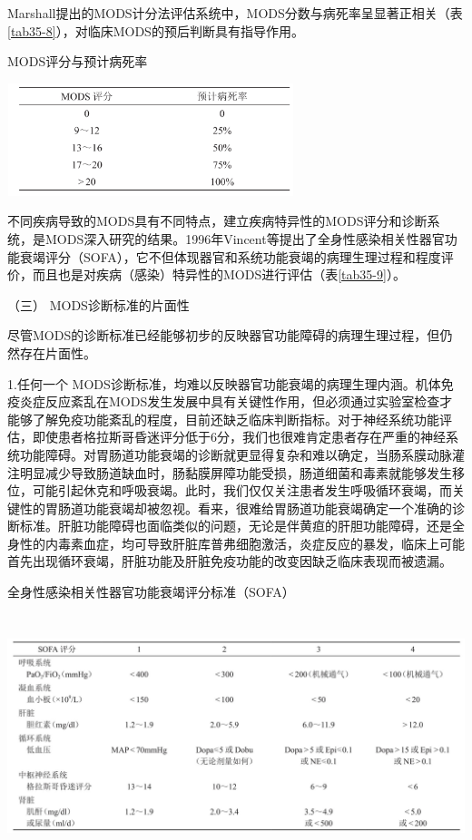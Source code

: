 Marshall提出的MODS计分法评估系统中，MODS分数与病死率呈显著正相关（表\ref{tab35-8}），对临床MODS的预后判断具有指导作用。

\begin{table}[htbp]
\centering
\caption{MODS评分与预计病死率}
\label{tab35-8}
\includegraphics[width=3.29167in,height=1.29167in]{./images/Image00140.jpg}
\end{table}

不同疾病导致的MODS具有不同特点，建立疾病特异性的MODS评分和诊断系统，是MODS深入研究的结果。1996年Vincent等提出了全身性感染相关性器官功能衰竭评分（SOFA），它不但体现器官和系统功能衰竭的病理生理过程和程度评价，而且也是对疾病（感染）特异性的MODS进行评估（表\ref{tab35-9}）。

\hypertarget{text00094.htmlux5cux23CHP3-11-3-3-3}{}
（三） MODS诊断标准的片面性

尽管MODS的诊断标准已经能够初步的反映器官功能障碍的病理生理过程，但仍然存在片面性。

1.任何一个
MODS诊断标准，均难以反映器官功能衰竭的病理生理内涵。机体免疫炎症反应紊乱在MODS发生发展中具有关键性作用，但必须通过实验室检查才能够了解免疫功能紊乱的程度，目前还缺乏临床判断指标。对于神经系统功能评估，即使患者格拉斯哥昏迷评分低于6分，我们也很难肯定患者存在严重的神经系统功能障碍。对胃肠道功能衰竭的诊断就更显得复杂和难以确定，当肠系膜动脉灌注明显减少导致肠道缺血时，肠黏膜屏障功能受损，肠道细菌和毒素就能够发生移位，可能引起休克和呼吸衰竭。此时，我们仅仅关注患者发生呼吸循环衰竭，而关键性的胃肠道功能衰竭却被忽视。看来，很难给胃肠道功能衰竭确定一个准确的诊断标准。肝脏功能障碍也面临类似的问题，无论是伴黄疸的肝胆功能障碍，还是全身性的内毒素血症，均可导致肝脏库普弗细胞激活，炎症反应的暴发，临床上可能首先出现循环衰竭，肝脏功能及肝脏免疫功能的改变因缺乏临床表现而被遗漏。

\begin{table}[htbp]
\centering
\caption{全身性感染相关性器官功能衰竭评分标准（SOFA）}
\label{tab35-9}
\includegraphics[width=6.60417in,height=2.80208in]{./images/Image00141.jpg}
\end{table}


